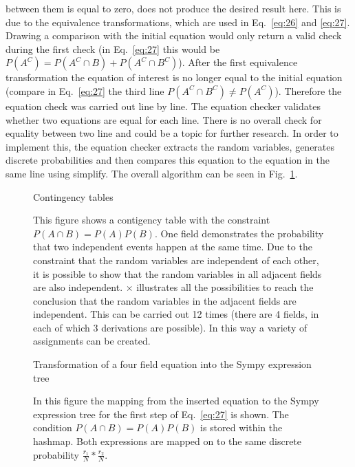     between them is equal to zero, does not produce the desired result here. This is due to the equivalence transformations, which are used in Eq.~\eqref{eq:26} and \eqref{eq:27}. Drawing a comparison with
    the initial equation would only return a valid check during the first check (in Eq.~\eqref{eq:27} this would be $P(A^{C}) = P(A^{C} \cap B) + P(A^{C} \cap B^{C})$). After
    the first equivalence transformation the equation of interest is no longer equal to the initial equation (compare in Eq.~\eqref{eq:27} the third line $P(A^{C} \cap B^{C}) \neq P(A^{C})$).
    Therefore the equation check was carried out line by line. The equation checker validates whether two equations are equal for each line. There is no overall check
    for equality between two line and could be a topic for further research. In order to implement this, the equation checker extracts the random variables, generates
    discrete probabilities and then compares this equation to the equation in the same line using simplify. The overall algorithm can be seen in Fig.~\ref{fig:FourFieldGraphic}.

    \begin{figure}
        
        \caption{Contingency tables}
        \caption*{This figure shows a contigency table with the constraint $P(A \cap B) = P(A)P(B)$.
        One field demonstrates the probability that two independent events happen at the same time.
        Due to the constraint that the random variables are independent of each other, it is possible to show that the random variables in
        all adjacent fields are also independent. $\times$ illustrates all the possibilities to reach the conclusion that the random variables in the adjacent fields are independent.
        This can be carried out 12 times (there are 4 fields, in each of which 3 derivations are possible). In this way
        a variety of assignments can be created.}
        \label{fig:FourFieldGraphic}
    \end{figure}

    \begin{figure}
        
        \caption{Transformation of a four field equation into the Sympy expression tree}
        \caption*{In this figure the mapping from the inserted equation to the Sympy expression tree for the first step of Eq.~\eqref{eq:27} is shown. The condition $P(A \cap B) = P(A)P(B)$ is stored within the hashmap.
        Both expressions are mapped on to the same discrete probability $\frac{r_{1}}{N}*\frac{r_{2}}{N}$.}
        \label{fig:transformationfourfig}
    \end{figure}


